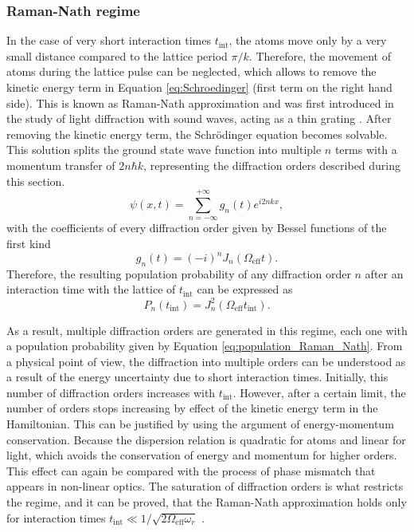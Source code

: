 \subsubsection{Raman-Nath regime}
In the case of very short interaction times $t_\text{int}$, the atoms move only by a very small distance compared to the lattice period $\pi/k$. Therefore, the movement of atoms during the lattice pulse can be neglected, which allows to remove the kinetic energy term in Equation \eqref{eq:Schroedinger} (first term on the right hand side). This is known as Raman-Nath approximation and was first introduced in the study of light diffraction with sound waves, acting as a thin grating \cite{Raman1935}. After removing the kinetic energy term, the Schr\"odinger equation becomes solvable. This solution splits the ground state wave function into multiple $n$ terms with a momentum transfer of $2n\hbar k$, representing the diffraction orders described during this section.
\begin{equation}
	\psi(x,t) = \sum_{n=-\infty}^{+\infty}g_n(t)e^{i 2nkx},
\end{equation}
with the coefficients of every diffraction order given by Bessel functions of the first kind \cite{Mueller2008}
\begin{equation}
	g_n(t) = (-i)^n J_n(\Omega_\text{eff} t).
\end{equation}
Therefore, the resulting population probability of any diffraction order $n$ after an interaction time with the lattice of $t_\text{int}$ can be expressed as
\begin{equation}\label{eq:population_Raman_Nath}
	P_n(t_\text{int}) = J_n^2(\Omega_\text{eff} t_\text{int}).
\end{equation}

As a result, multiple diffraction orders are generated in this regime, each one with a population probability given by Equation \eqref{eq:population_Raman_Nath}. From a physical point of view, the diffraction into multiple orders can be understood as a result of the energy uncertainty due to short interaction times. Initially, this number of diffraction orders increases with $t_\text{int}$. However, after a certain limit, the number of orders stops increasing by effect of the kinetic energy term in the Hamiltonian. This can be justified by using the argument of energy-momentum conservation. Because the dispersion relation is quadratic for atoms and linear for light, which avoids the conservation of energy and momentum for higher orders. This effect can again be compared with the process of phase mismatch that appears in non-linear optics. The saturation of diffraction orders is what restricts the regime, and it can be proved, that the Raman-Nath approximation holds only for interaction times $t_\text{int} \ll 1/\sqrt{2\Omega_\text{eff} \omega_r}$ \cite{Meystre2001}. 


